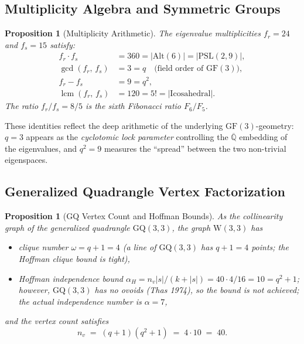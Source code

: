 \documentclass[12pt,a4paper]{article}
\newtheorem{proposition}[theorem]{Proposition}
\newcommand{\W}{\mathrm{W}(3,3)}
\newcommand{\nv}{n_{\!v}}
\newcommand{\fr}{f_{\!r}}
\newcommand{\fs}{f_{\!s}}
\newcommand{\GF}{\mathrm{GF}}
\newcommand{\Alt}{\mathrm{Alt}}
\begin{document}
\subsection{Multiplicity Algebra and Symmetric Groups}

\begin{proposition}[Multiplicity Arithmetic]
\label{prop:multarith}
The eigenvalue multiplicities $\fr = 24$ and $\fs = 15$ satisfy:
\begin{align}
  \fr\cdot\fs &= 360 = |\Alt(6)| = |\mathrm{PSL}(2,9)|,\\
  \gcd(\fr,\,\fs) &= 3 = q
  \quad\text{(field order of }\GF(3)\text{)},\\
  \fr - \fs  &= 9 = q^2,\\
  \operatorname{lcm}(\fr,\,\fs) &= 120 = 5! = |\mathrm{Icosahedral}|.
\end{align}
The ratio $\fr/\fs = 8/5$ is the sixth Fibonacci ratio $F_6/F_5$.
\end{proposition}

These identities reflect the deep arithmetic of the underlying
$\GF(3)$-geometry: $q=3$ appears as the \emph{cyclotomic lock
parameter} controlling the $\overline{\mathbb{Q}}$ embedding of
the eigenvalues, and $q^2=9$ measures the ``spread'' between the
two non-trivial eigenspaces.

\subsection{Generalized Quadrangle Vertex Factorization}

\begin{proposition}[GQ Vertex Count and Hoffman Bounds]
\label{prop:gqfactor}
As the collinearity graph of the generalized quadrangle $\mathrm{GQ}(3,3)$,
the graph $\W$ has
\begin{itemize}
  \item clique number $\omega = q+1 = 4$ (a \emph{line} of $\mathrm{GQ}(3,3)$
        has $q+1=4$ points; the Hoffman clique bound is tight),
  \item Hoffman independence bound $\alpha_H = \nv|s|/(k+|s|) = 40\cdot 4/16 = 10 = q^2+1$;
        however, $\mathrm{GQ}(3,3)$ has \emph{no ovoids}
        (Thas 1974), so the bound is \emph{not} achieved;
        the actual independence number is $\alpha = 7$,
\end{itemize}
and the vertex count satisfies
\[
  \nv \;=\; (q+1)(q^2+1) \;=\; 4\cdot 10 \;=\; 40.
\]
\end{proposition}
\end{document}
